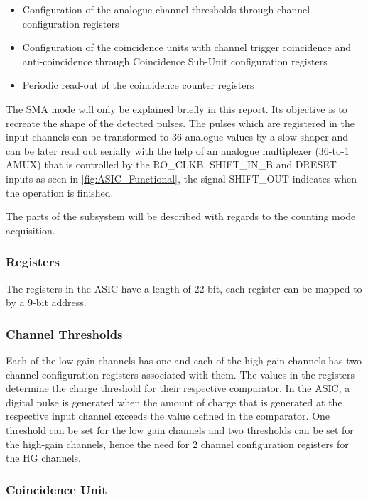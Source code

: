 \begin{itemize}
\item Configuration of the analogue channel thresholds through channel configuration registers

\item Configuration of the coincidence units with channel trigger coincidence and anti-coincidence through Coincidence Sub-Unit configuration registers
\item Periodic read-out of the coincidence counter registers

\end{itemize}

The SMA mode will only be explained briefly in this report.
Its objective is to recreate the shape of the detected
pulses. The pulses which are registered in the input
channels can be transformed to 36 analogue values by a slow
shaper and can be later read out serially with the help of
an analogue multiplexer (36-to-1 AMUX) that is controlled
by the RO\_CLKB, SHIFT\_IN\_B and DRESET inputs as seen in
\ref{fig:ASIC_Functional}, the signal SHIFT\_OUT
indicates when the operation is finished.

The parts of the subsystem will be described with regards to the counting mode acquisition. 

\subsubsection{Registers}

The registers in the ASIC have a length of 22 bit, each register can be mapped to by a 9-bit address.

\subsubsection{Channel Thresholds}

Each of the low gain channels has one and each of the high gain channels has two channel configuration registers associated with them. The values in the registers determine the charge threshold for their respective comparator. In the ASIC, a digital pulse is generated when the amount of charge that is generated at the respective input channel exceeds the value defined in the comparator. One threshold can be set for the low gain channels and two thresholds can be set for the high-gain channels, hence the need for 2 channel configuration registers for the HG channels.

\subsubsection{Coincidence Unit}

